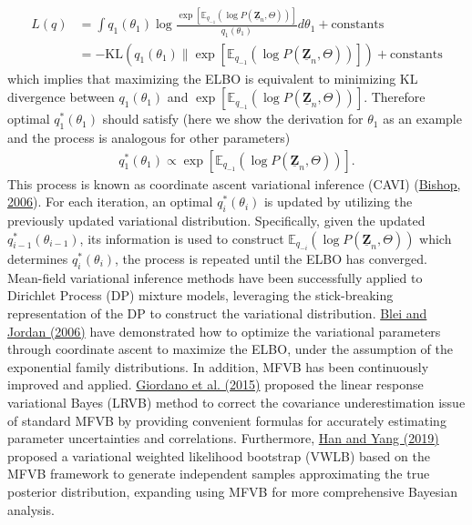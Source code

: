 \documentclass[12pt,a4paper]{article}
\begin{document}
\begin{align*}
L(q) &= \int q_1(\theta_1) \log \frac{\exp \left[\mathbb{E}_{q_{-1}}(\log P(\underline{\mathbf{Z}}_n, \Theta))\right]}{q_1(\theta_1)} d\theta_1 + \text{constants}\\
&= -\text{KL}\left(q_1(\theta_1) \| \exp \left[\mathbb{E}_{q_{-1}}(\log P(\underline{\mathbf{Z}}_n, \Theta))\right]\right)+ \text{constants}
\end{align*}
which implies that maximizing the ELBO is equivalent to minimizing KL divergence between $q_1(\theta_1)$ and $\exp \left[\mathbb{E}_{q_{-1}}(\log P(\underline{\mathbf{Z}}_n, \Theta))\right]$. Therefore optimal $q_1^*(\theta_1)$ should satisfy (here we show the derivation for $\theta_1$ as an example and the process is analogous for other parameters)
\begin{align*}
q_1^*(\theta_1) \propto \exp \left[\mathbb{E}_{q_{-1}}(\log P(\underline{\mathbf{Z}}_n, \Theta))\right].
\end{align*}
This process is known as coordinate ascent variational inference (CAVI) (\hyperref[bishop2006]{Bishop, 2006}). For each iteration, an optimal $q^*_i(\theta_i)$ is updated by utilizing the previously updated variational distribution. Specifically, given the updated $q^*_{i-1}(\theta_{i-1})$, its information is used to construct $\mathbb{E}_{q_{-i}}(\log P(\underline{\mathbf{Z}}_n, \Theta))$ which determines $q^*_i(\theta_i)$, the process is repeated until the ELBO has converged. Mean-field variational inference methods have been successfully applied to Dirichlet Process (DP) mixture models, leveraging the stick-breaking representation of the DP to construct the variational distribution. \hyperref[blei2006]{Blei and Jordan (2006)} have demonstrated how to optimize the variational parameters through coordinate ascent to maximize the ELBO, under the assumption of the exponential family distributions. In addition, MFVB has been continuously improved and applied. \hyperref[giordano2015]{Giordano et al. (2015)} proposed the linear response variational Bayes (LRVB) method to correct the covariance underestimation issue of standard MFVB by providing convenient formulas for accurately estimating parameter uncertainties and correlations. Furthermore, \hyperref[han2019]{Han and Yang (2019)} proposed a variational weighted likelihood bootstrap (VWLB) based on the MFVB framework to generate independent samples approximating the true posterior distribution, expanding using MFVB for more comprehensive Bayesian analysis.
\end{document}
